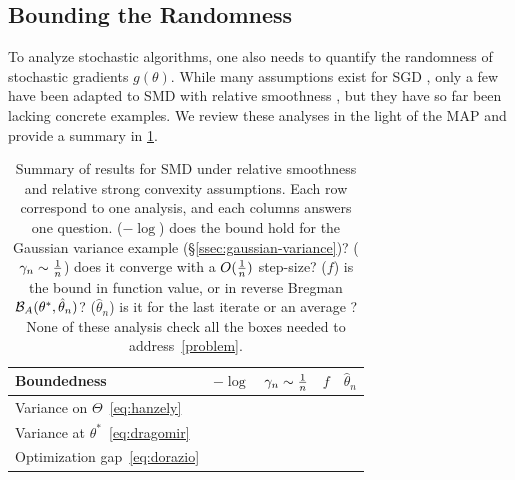 \documentclass[twoside]{article}
\newcommand*{\expect}[2][]{\ensuremath{\mathbb{E}_{#1} \left[ #2 \right] }} %
\newcommand{\logpart}{A}
\newcommand{\bregman}{\cB_\logpart}
\newcommand{\nat}{\theta}
\newcommand{\m}{\mu}
\newcommand{\lr}{\gamma} %
\begin{document}
\subsection{Bounding the Randomness}

To analyze stochastic algorithms, one also needs to quantify the randomness of stochastic gradients $g(\nat)$.
While many assumptions exist for SGD \citep[\S3 for a modern review]{khaled2020better}, only a few have been adapted to SMD with relative smoothness \citep{hanzely2018fastest, dragomir2021fast, dorazio2021stochastic}, but they have so far been lacking concrete examples.
We review these analyses in the light of the MAP and provide a summary in \cref{tbl:assumptions}.

\begin{table}[t]
	\newcommand*{\greencmark}{\textcolor{Green}{\cmark}}
	\newcommand*{\redxmark}{\textcolor{Red}{\xmark}}
	\caption{Summary of results for SMD
		under relative smoothness and relative strong convexity assumptions.
		Each row correspond to one analysis, and each columns answers one question.
		($-\log$) does the bound hold for the Gaussian variance example (\S\ref{ssec:gaussian-variance})?
		($\lr_n \sim \inv{n}$) does it converge with a $O(\frac{1}{n})$ step-size?
		($f$) is the bound in function value, or in reverse Bregman $\bregman(\nat^*,\hat\nat_n)$?
		($\hat\nat_n$) is it for the last iterate or an average ?
		None of these analysis check all the boxes needed to address~\eqref{problem}.
	}
	\begin{center}
		\begin{tabular}{lcccc}
			\toprule
			Boundedness & $-\log$ &  $\lr_n \sim \inv{n}$ & $f$ & $\hat\nat_n$ \\
			\midrule
			Variance on $\Theta$~\eqref{eq:hanzely} %
			& \redxmark & \greencmark & \greencmark  & \redxmark
			\\
			Variance at $\theta^*$~\eqref{eq:dragomir} %
			& \redxmark & \greencmark & \redxmark  & \greencmark
			\\
			Optimization gap~\eqref{eq:dorazio} %
			& \greencmark & \redxmark & \redxmark & \greencmark
			\\
			\bottomrule
		\end{tabular}
	\end{center}
	\label{tbl:assumptions}
\end{table}
\end{document}
